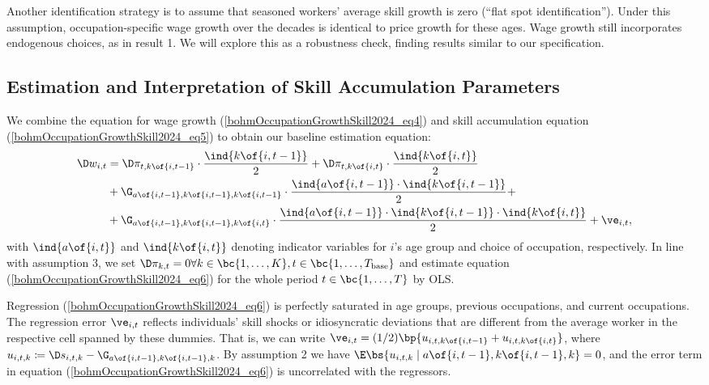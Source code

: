 \documentclass[12pt]{article}
\theoremstyle{definition}
\begin{document}
Another identification strategy is to assume that seasoned workers' average skill growth is zero (``flat spot identification''). Under this assumption, occupation-specific wage growth over the decades is identical to price growth for these ages. Wage growth still incorporates endogenous choices, as in result 1. We will explore this as a robustness check, finding results similar to our specification.

\subsection{Estimation and Interpretation of Skill Accumulation Parameters}

We combine the equation for wage growth (\ref{bohmOccupationGrowthSkill2024_eq4}) and skill accumulation equation (\ref{bohmOccupationGrowthSkill2024_eq5}) to obtain our baseline estimation equation:
\begin{equation}
    \label{bohmOccupationGrowthSkill2024_eq6}
    \begin{aligned}
        \D w_{i,t} & = \D \pi_{t, k\of{i, t-1}} \cdot \frac{\ind{k\of{i, t-1}}}{2} + \D \pi_{t, k\of{i, t}} \cdot \frac{\ind{k\of{i,t}}}{2} \\
        & + \G_{a\of{i,t-1}, k\of{i, t-1}, k\of{i,t-1}} \cdot \frac{\ind{a\of{i, t-1}} \cdot \ind{k\of{i, t-1}}}{2} + \\
        & + \G_{a\of{i, t-1}, k\of{i, t-1}, k\of{i, t}} \cdot \frac{\ind{a\of{i,t-1}} \cdot \ind{k\of{i, t-1}} \cdot \ind{k\of{i,t}}}{2} + \ve_{i, t},
    \end{aligned}
\end{equation}
with $\ind{a\of{i,t}}$ and $\ind{k\of{i,t}}$ denoting indicator variables for $i$'s age group and choice of occupation, respectively. In line with assumption 3, we set $\D \pi_{k,t} = 0 \forall k \in \bc{1, \ldots, K}, t \in \bc{1, \ldots, T_{\text{base}}}$ and estimate equation (\ref{bohmOccupationGrowthSkill2024_eq6}) for the whole period $t \in \bc{1, \ldots, T}$ by OLS.

Regression (\ref{bohmOccupationGrowthSkill2024_eq6}) is perfectly saturated in age groups, previous occupations, and current occupations. The regression error $\ve_{i,t}$ reflects individuals' skill shocks or idiosyncratic deviations that are different from the average worker in the respective cell spanned by these dummies. That is, we can write $\ve_{i,t} = (1/2) \bp{u_{i, t, k\of{i, t-1}} + u_{i, t, k\of{i,t}}}$, where $u_{i, t, k} \coloneqq \D s_{i, t, k} - \G_{a\of{i, t-1}, k\of{i, t-1}, k}$. By assumption 2 we have $\E\bs{u_{i, t, k} \mid a\of{i, t-1}, k\of{i, t-1}, k} = 0$, and the error term in equation (\ref{bohmOccupationGrowthSkill2024_eq6}) is uncorrelated with the regressors.
\end{document}
